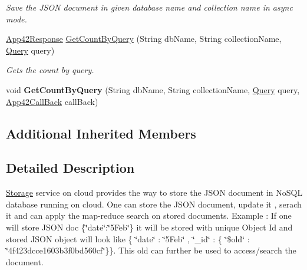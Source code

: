 \begin{DoxyCompactItemize}
\begin{DoxyCompactList}\small\item\em Save the J\+S\+O\+N document in given database name and collection name in async mode. \end{DoxyCompactList}\item 
\hyperlink{classcom_1_1shephertz_1_1app42_1_1paas_1_1sdk_1_1csharp_1_1_app42_response}{App42\+Response} \hyperlink{classcom_1_1shephertz_1_1app42_1_1paas_1_1sdk_1_1csharp_1_1storage_1_1_storage_service_a42190efcdb7c7895b80219c73de18e54}{Get\+Count\+By\+Query} (String db\+Name, String collection\+Name, \hyperlink{classcom_1_1shephertz_1_1app42_1_1paas_1_1sdk_1_1csharp_1_1storage_1_1_query}{Query} query)
\begin{DoxyCompactList}\small\item\em Gets the count by query. \end{DoxyCompactList}\item 
\hypertarget{classcom_1_1shephertz_1_1app42_1_1paas_1_1sdk_1_1csharp_1_1storage_1_1_storage_service_a845bfc96016e7388a6b699873a6f9b04}{void {\bfseries Get\+Count\+By\+Query} (String db\+Name, String collection\+Name, \hyperlink{classcom_1_1shephertz_1_1app42_1_1paas_1_1sdk_1_1csharp_1_1storage_1_1_query}{Query} query, \hyperlink{interfacecom_1_1shephertz_1_1app42_1_1paas_1_1sdk_1_1csharp_1_1_app42_call_back}{App42\+Call\+Back} call\+Back)}\label{classcom_1_1shephertz_1_1app42_1_1paas_1_1sdk_1_1csharp_1_1storage_1_1_storage_service_a845bfc96016e7388a6b699873a6f9b04}

\end{DoxyCompactItemize}
\subsection*{Additional Inherited Members}


\subsection{Detailed Description}
\hyperlink{classcom_1_1shephertz_1_1app42_1_1paas_1_1sdk_1_1csharp_1_1storage_1_1_storage}{Storage} service on cloud provides the way to store the J\+S\+O\+N document in No\+S\+Q\+L database running on cloud. One can store the J\+S\+O\+N document, update it , serach it and can apply the map-\/reduce search on stored documents. Example \+: If one will store J\+S\+O\+N doc \{\char`\"{}date\char`\"{}\+:\char`\"{}5\+Feb\char`\"{}\} it will be stored with unique Object Id and stored J\+S\+O\+N object will look like \{ \char`\"{}date\char`\"{} \+: \char`\"{}5\+Feb\char`\"{} , \char`\"{}\+\_\+id\char`\"{} \+: \{ \char`\"{}\$old\char`\"{} \+: \char`\"{}4f423dcce1603b3f0bd560cf\char`\"{}\}\}. This old can further be used to access/search the document. 


